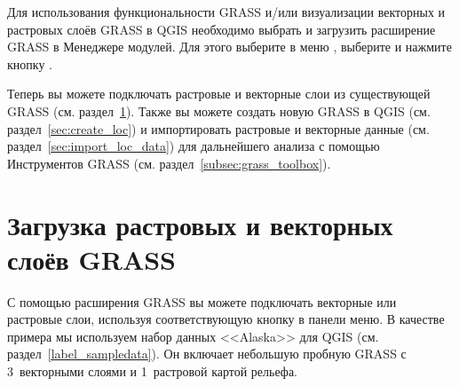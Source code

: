 Для использования функциональности GRASS и/или визуализации векторных
и растровых слоёв GRASS в QGIS необходимо выбрать и загрузить расширение
GRASS в Менеджере модулей. Для этого выберите в меню
 \arrow {}, выберите
 и нажмите кнопку .

Теперь вы можете подключать растровые и векторные слои из существующей
 GRASS (см. раздел~\ref{sec:load_grassdata}). Также
вы можете создать новую  GRASS в QGIS (см.
раздел~\ref{sec:create_loc}) и импортировать растровые и векторные
данные (см. раздел~\ref{sec:import_loc_data}) для дальнейшего анализа
с помощью Инструментов GRASS (см. раздел~\ref{subsec:grass_toolbox}).

\section{Загрузка растровых и векторных слоёв GRASS}\label{sec:load_grassdata}

С помощью расширения GRASS вы можете подключать векторные или растровые
слои, используя соответствующую кнопку в панели меню. В качестве примера
мы используем набор данных <<Alaska>> для QGIS (см. раздел~\ref{label_sampledata}).
Он включает небольшую пробную  GRASS с 3~векторными
слоями и 1~растровой картой рельефа.

